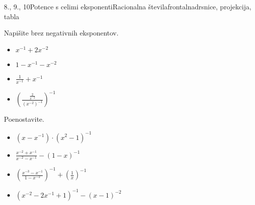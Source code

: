 \begin{priprava}{8., 9., 10}{}{Potence s celimi eksponenti}{Racionalna števila}{frontalna}{drsnice, projekcija, tabla}
            \begin{naloga}
                Napišite brez negativnih eksponentov.
                \begin{itemize}
                    \item $x^{-1}+2x^{-2}$ 
                    \item $1-x^{-1}-x^{-2}$ 
                    \item $\frac{1}{x^{-1}}+x^{-1}$ 
                    \item $\left(\frac{\frac{2}{x^{-2}}}{\left(x^{-2}\right)^{-1}}\right)^{-1}$ 
                \end{itemize}
            \end{naloga}
        

            \begin{naloga}
                Poenostavite.
                \begin{itemize}
                    \item $\left(x-x^{-1}\right)\cdot\left(x^2-1\right)^{-1}$ 
                    \item $\frac{x^{-2}+x^{-1}}{x^{-2}-x^{-1}}-\left(1-x\right)^{-1}$ 
                    \item $\left(\frac{x^{-3}-x^{-1}}{1-x^{-2}}\right)^{-1}+\left(\frac{1}{x}\right)^{-1}$ 
                    \item $\left(x^{-2}-2x^{-1}+1\right)^{-1}-\left(x-1\right)^{-2}$ 
                \end{itemize}
            \end{naloga}


\end{priprava}